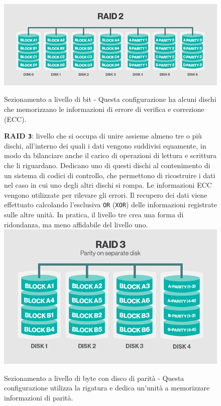 \begin{itemize}
\begin{figure}[htbp]
\centering
\includegraphics[scale=0.50]{img/raid22.png}\\
\caption{Sezionamento a livello di bit - Questa configurazione ha alcuni dischi che memorizzano le informazioni di errore di verifica e correzione (ECC).\label{figura1.6} \cite{etichetta9}}
\end{figure}

\begin{figure}[htbp]
\item
\textbf{RAID \verb"3"}: livello che si occupa di unire assieme almeno tre o pi\`{u} dischi, all'interno dei quali i dati vengono suddivisi equamente, in modo da bilanciare anche il carico di operazioni di lettura e scrittura che li riguardano. Dedicano uno di questi dischi al contenimento di un sistema di codici di controllo, che permettono di ricostruire i dati nel caso in cui uno degli altri dischi si rompa. Le informazioni ECC vengono utilizzate per rilevare gli errori. Il recupero dei dati viene effettuato calcolando l'esclusiva \verb"OR" (\verb"XOR") delle informazioni registrate sulle altre unit\`{a}.\cite{etichetta9} %
In pratica, il livello tre crea una forma di ridondanza, ma meno affidabile del livello uno.\\

\centering
\includegraphics[scale=0.40]{img/raid33.png}\\
\caption{Sezionamento a livello di byte con disco di parit\`{a} - Questa configurazione utilizza la rigatura e dedica un'unit\`{a} a memorizzare informazioni di parit\`{a}.\label{figura1.7} \cite{etichetta9}}
\end{figure}


\end{itemize}
